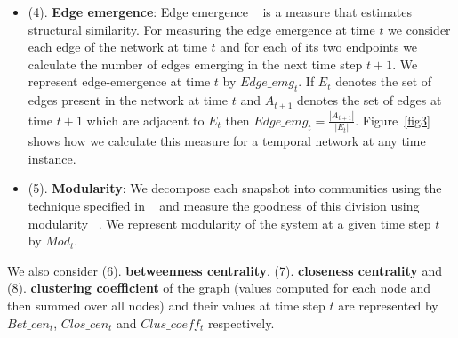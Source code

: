 \begin{itemize}
\begin{figure}[h]
\begin{center}
%   
  
 
 \end{center}
 \end{figure}

   
\item (4). {\bf  Edge emergence}: Edge emergence ~\cite{sur2014attack} is a measure that estimates structural similarity. For measuring the 
  edge emergence at time $t$ we consider each edge of the network at time $t$ and for each of its two endpoints we calculate the number of edges 
  emerging in the next time step $t+1$. We represent edge-emergence at time $t$ by $Edge\_emg_{t}$. If $E_t$ denotes the set of edges present in the network at time $t$ 
  and $A_{t+1}$ denotes the set of edges at time $t+1$ which are adjacent to $E_t$ then $Edge\_emg_{t}=\frac{|A_{t+1}|}{|E_{t}|}$. 
Figure~\ref{fig3} shows how we calculate this measure for a temporal network at any time instance.
  
  
  \item (5). {\bf  Modularity}: We decompose each snapshot into communities using the technique specified in ~\cite{blondel2008fast}
  and measure the goodness of this division using modularity ~\cite{newman2006modularity}. We represent modularity 
  of the system at a given time step {$t$} by {$Mod_{t}$}. 
  
  
 \end{itemize}
 We also consider (6). {\bf  betweenness centrality}, (7). {\bf closeness centrality} and (8). {\bf  clustering coefficient} of the graph (values computed for each node and then summed over all nodes) 
and their values at time step $t$ are represented by 
  {$Bet\_cen_{t}$}, {$Clos\_cen_{t}$} and {$Clus\_coeff_{t}$} respectively.

\medskip

